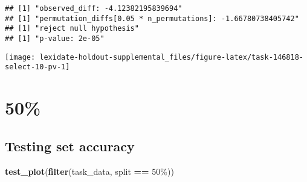 \documentclass[
]{book}
\newenvironment{Shaded}{\begin{snugshade}}{\end{snugshade}}
\newcommand{\AttributeTok}[1]{\textcolor[rgb]{0.13,0.29,0.53}{#1}}
\newcommand{\DecValTok}[1]{\textcolor[rgb]{0.00,0.00,0.81}{#1}}
\newcommand{\FunctionTok}[1]{\textcolor[rgb]{0.13,0.29,0.53}{\textbf{#1}}}
\newcommand{\NormalTok}[1]{#1}
\newcommand{\OtherTok}[1]{\textcolor[rgb]{0.56,0.35,0.01}{#1}}
\newcommand{\SpecialCharTok}[1]{\textcolor[rgb]{0.81,0.36,0.00}{\textbf{#1}}}
\newcommand{\StringTok}[1]{\textcolor[rgb]{0.31,0.60,0.02}{#1}}
\begin{document}
\begin{Shaded}
\end{Shaded}

\begin{verbatim}
## [1] "observed_diff: -4.12382195839694"
## [1] "permutation_diffs[0.05 * n_permutations]: -1.66780738405742"
## [1] "reject null hypothesis"
## [1] "p-value: 2e-05"
\end{verbatim}

\texttt{[image: lexidate-holdout-supplemental\_files/figure-latex/task-146818-select-10-pv-1]}

\hypertarget{section-2}{%
\section{50\%}\label{section-2}}

\hypertarget{testing-set-accuracy-2}{%
\subsection{Testing set accuracy}\label{testing-set-accuracy-2}}

\begin{Shaded}
\begin{Highlighting}[]
\FunctionTok{test\_plot}\NormalTok{(}\FunctionTok{filter}\NormalTok{(task\_data, split }\SpecialCharTok{==} \StringTok{\textquotesingle{}50\%\textquotesingle{}}\NormalTok{))}
\end{Highlighting}
\end{Shaded}
\end{document}

